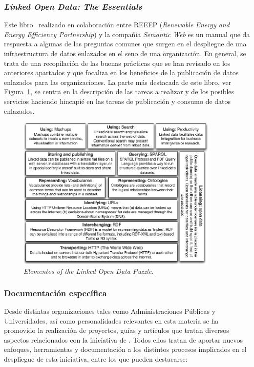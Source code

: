 \subsubsection{\textit{Linked Open Data: The Essentials}}\label{linked-data-spec}
Este libro~\cite{Bauer2012} realizado en colaboración entre \gls{REEEP} (\textit{Renewable Energy and Energy Efficiency Partnership}) y la compañía \textit{Semantic Web}
es un manual que da respuesta a algunas de las preguntas comunes que surgen en el despliegue de una infraestructura de datos enlazados
en el seno de una organización. En general, se trata de una recopilación de las buenas prácticas que se han revisado
en los anteriores apartados y que focaliza en los beneficios de la publicación de datos enlazados para las
organizaciones. La parte más destacada de este libro, ver Figura~\ref{fig:lod-essentials}, se centra en la descripción de las tareas
a realizar y de los posibles servicios haciendo hincapié en las tareas de publicación y consumo de datos enlazados.

\begin{figure}[!htb]
\centering
	\includegraphics[width=10cm]{images/phd/lod-essentials}
\caption{\textit{Elementos of the Linked Open Data Puzzle}.}
\label{fig:lod-essentials}
\end{figure}


\subsubsection{Documentación específica}\label{linked-data-spec}
Desde distintas organizaciones tales como Administraciones Públicas y Universidades,
así como personalidades relevantes en esta materia se ha promovido la realización de proyectos, guías y artículos que tratan diversos aspectos
relacionados con la iniciativa de \linkeddata. Todos ellos tratan de aportar nuevos enfoques, herramientas y documentación
a los distintos procesos implicados en el despliegue de esta iniciativa, entre los que pueden destacarse:

